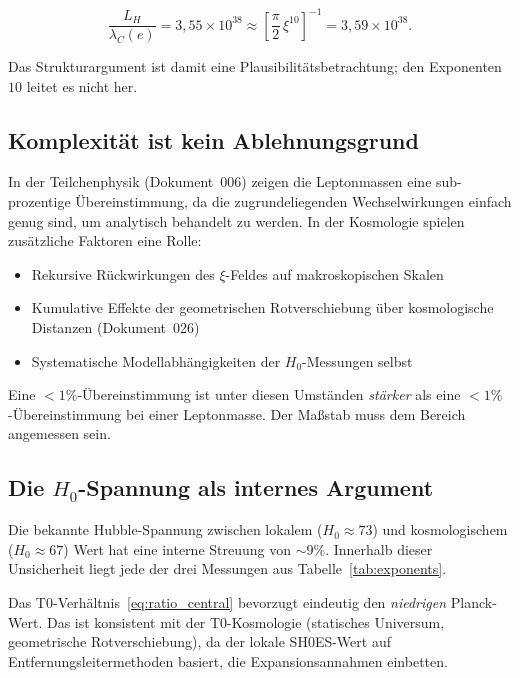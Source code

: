\begin{equation}
    \frac{L_H}{\lambda_C(e)} = 3{,}55\times10^{38} \approx \left[\frac{\pi}{2}\,\xi^{10}\right]^{-1} = 3{,}59\times10^{38}.
\end{equation}

Das Strukturargument ist damit eine Plausibilitätsbetrachtung; den Exponenten $10$
leitet es nicht her.

\subsection{Komplexität ist kein Ablehnungsgrund}

In der Teilchenphysik (Dokument~006) zeigen die Leptonmassen eine
sub-prozentige Übereinstimmung, da die zugrundeliegenden Wechselwirkungen
einfach genug sind, um analytisch behandelt zu werden. In der Kosmologie
spielen zusätzliche Faktoren eine Rolle:

\begin{itemize}
    \item Rekursive Rückwirkungen des $\xi$-Feldes auf makroskopischen Skalen
    \item Kumulative Effekte der geometrischen Rotverschiebung über
          kosmologische Distanzen (Dokument~026)
    \item Systematische Modellabhängigkeiten der $H_0$-Messungen selbst
\end{itemize}

Eine $<1\%$-Übereinstimmung ist unter diesen Umständen
\emph{stärker} als eine $<1\%$-Übereinstimmung bei einer Leptonmasse.
Der Maßstab muss dem Bereich angemessen sein.

\subsection{Die \texorpdfstring{$H_0$}{H0}-Spannung als internes Argument}

Die bekannte Hubble-Spannung zwischen lokalem ($H_0 \approx 73$) und
kosmologischem ($H_0 \approx 67$) Wert hat eine interne Streuung von $\sim
9\%$. Innerhalb dieser Unsicherheit liegt jede der drei Messungen aus
Tabelle~\ref{tab:exponents}.

Das T0-Verhältnis~\eqref{eq:ratio_central} bevorzugt eindeutig den
\emph{niedrigen} Planck-Wert. Das ist konsistent mit der T0-Kosmologie
(statisches Universum, geometrische Rotverschiebung), da der lokale
SH0ES-Wert auf Entfernungsleitermethoden basiert, die Expansionsannahmen
einbetten.

